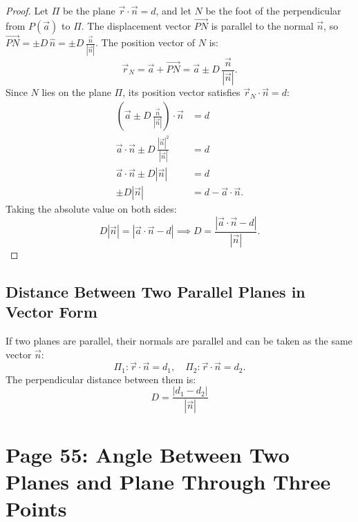 \begin{proof}
Let $\Pi$ be the plane $\vec{r} \cdot \vec{n} = d$, and let $N$ be the foot of the perpendicular from $P(\vec{a})$ to $\Pi$.
The displacement vector $\vec{PN}$ is parallel to the normal $\vec{n}$, so $\vec{PN} = \pm D\,\hat{n} = \pm D\,\frac{\vec{n}}{|\vec{n}|}$.
The position vector of $N$ is:
\begin{equation}
    \vec{r}_N = \vec{a} + \vec{PN} = \vec{a} \pm D\,\frac{\vec{n}}{|\vec{n}|}.
\end{equation}
Since $N$ lies on the plane $\Pi$, its position vector satisfies $\vec{r}_N \cdot \vec{n} = d$:
\begin{align}
    \left(\vec{a} \pm D\,\frac{\vec{n}}{|\vec{n}|}\right) \cdot \vec{n} &= d \nonumber\\
    \vec{a} \cdot \vec{n} \pm D\,\frac{|\vec{n}|^2}{|\vec{n}|} &= d \nonumber\\
    \vec{a} \cdot \vec{n} \pm D|\vec{n}| &= d \nonumber\\
    \pm D|\vec{n}| &= d - \vec{a} \cdot \vec{n}.
\end{align}
Taking the absolute value on both sides:
\begin{equation}
    D|\vec{n}| = |\vec{a} \cdot \vec{n} - d| \implies \boxed{D = \frac{|\vec{a} \cdot \vec{n} - d|}{|\vec{n}|}}.
\end{equation}
\end{proof}

\subsection{Distance Between Two Parallel Planes in Vector Form}
If two planes are parallel, their normals are parallel and can be taken as the same vector $\vec{n}$:
\begin{equation}
    \Pi_1: \vec{r} \cdot \vec{n} = d_1, \quad \Pi_2: \vec{r} \cdot \vec{n} = d_2.
\end{equation}
The perpendicular distance between them is:
\begin{equation}
    \boxed{D = \frac{|d_1 - d_2|}{|\vec{n}|}}
\end{equation}

\section{Page 55: Angle Between Two Planes and Plane Through Three Points}
\label{sec:page55}

